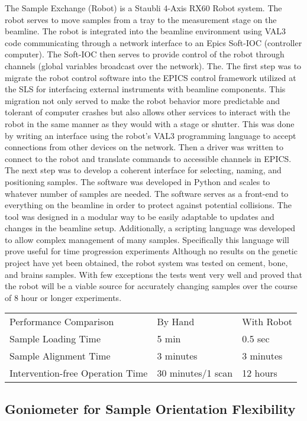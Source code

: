 The Sample Exchange (Robot) is a Staubli 4-Axis RX60 Robot system. The robot serves to move samples from a tray to the measurement stage on the beamline. The robot is integrated into the beamline environment using VAL3 code communicating through a network interface to an Epics Soft-IOC (controller computer). The Soft-IOC then serves to provide control of the robot through channels (global variables broadcast over the network). The. The first step was to migrate the robot control software into the EPICS control framework utilized at the SLS for interfacing external instruments with beamline components. This migration not only served to make the robot behavior more predictable and tolerant of computer crashes but also allows other services to interact with the robot in the same manner as they would with a stage or shutter. This was done by writing an interface using the robot's VAL3 programming language to accept connections from other devices on the network. Then a driver was written to connect to the robot and translate commands to accessible channels in EPICS. The next step was to develop a coherent interface for selecting, naming, and positioning samples. The software was developed in Python and scales to whatever number of samples are needed. The software serves as a front-end to everything on the beamline in order to protect against potential collisions. The tool was designed in a modular way to be easily adaptable to updates and changes in the beamline setup. Additionally, a scripting language was developed to allow complex management of many samples. Specifically this language will prove useful for time progression experiments 
Although no results on the genetic project have yet been obtained, the robot system was tested on cement, bone, and brains samples. With few exceptions the tests went very well and proved that the robot will be a viable source for accurately changing samples over the course of 8 hour or longer experiments.
\begin{center}
\begin{tabular}{|l|l|l|}
Performance Comparison & By Hand & With Robot \\
Sample Loading Time & 5 min & 0.5 sec \\
Sample Alignment Time & 3 minutes & 3 minutes\\
Intervention-free Operation Time & 30 minutes/1 scan & 12 hours
\end{tabular}
\end{center}

\subsection{Goniometer for Sample Orientation Flexibility}
